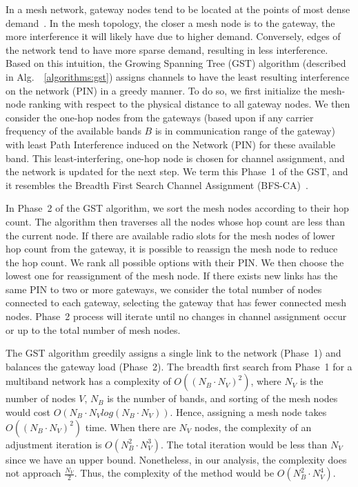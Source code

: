 In a mesh network, gateway nodes tend to be located at the points
of most dense demand~\cite{robinson2008adding, he2008optimizing}.
In the mesh topology, the closer a mesh node is to the gateway,
the more interference it will likely have due to higher demand.
Conversely, edges of the network tend to have more sparse demand,
resulting in less interference. Based on this intuition,
the Growing Spanning Tree (GST) algorithm (described in Alg.~~\ref{algorithms:gst})
assigns channels to have the least resulting interference on the network (PIN) in a
greedy manner. To do so, we first initialize the mesh-node ranking
with respect to the physical distance to all gateway nodes.
We then consider the one-hop nodes from the gateways (based upon
if any carrier frequency of the available bands $B$ is in
communication range of the gateway) with least Path Interference
induced on the Network (PIN) for these available band. This
least-interfering, one-hop node is chosen for channel assignment,
and the network is updated for the next step. We term this Phase~1
of the GST, and it resembles the Breadth First Search Channel
Assignment (BFS-CA)~\cite{ramachandran2006interference}.

In Phase~2 of the GST algorithm, we sort the mesh nodes according
to their hop count.  The algorithm then
traverses all the nodes whose hop count are less than the current node.
If there are available radio slots for the mesh nodes of lower hop
count from the gateway, it is possible to reassign the mesh node
to reduce the hop count.  We rank all possible options with their PIN.
We then choose the lowest one for reassignment of the mesh node. If
there exists new links has the same PIN to two or more gateways, we
consider the total number of nodes connected to each gateway, selecting
the gateway that has fewer connected mesh nodes. Phase~2 process will
iterate until no changes in channel assignment occur or up to the total
number of mesh nodes.


The GST algorithm greedily assigns a single link to the network (Phase~1) 
and balances the gateway load (Phase~2). 
The breadth first search from Phase~1 for a multiband network has a complexity 
of $O((N_B \cdot N_V)^2)$, where $N_V$ is the number of nodes $V$, $N_B$ is the number of bands, 
and sorting of the mesh nodes would cost $O(N_B \cdot N_V log(N_B \cdot N_V))$. 
Hence, assigning a mesh node takes $O((N_B \cdot N_V)^2)$ time. When there are $N_V$ nodes, 
the complexity of an adjustment iteration is $O(N_B^2 \cdot N_V^3)$.
The total iteration would be less than $N_V$ since we have an upper bound.  
Nonetheless, in our analysis, the complexity does not approach $\frac{N_V}{2}$.
Thus, the complexity of the method would be $O(N_B^2 \cdot N_V^4)$.

